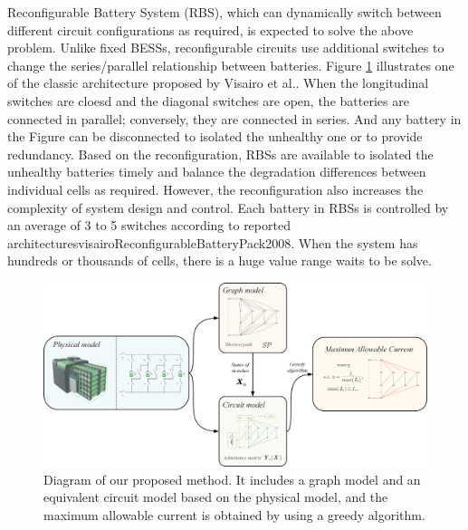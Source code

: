 \documentclass{article}
\begin{document}
Reconfigurable Battery System (RBS), which can dynamically  switch between different circuit configurations as required, is expected to solve the above problem\cite{hanNextGenerationBatteryManagement2020a}.
Unlike fixed BESSs, reconfigurable circuits use additional switches to change the series/parallel relationship between batteries.
Figure \ref{fig:1} illustrates one of the classic architecture proposed by Visairo et al.\cite{visairoReconfigurableBatteryPack2008}.
When the longitudinal switches are cloesd and the diagonal switches are open, the batteries are connected in parallel; conversely, they are connected in series.
And any battery in the Figure can be disconnected to isolated the unhealthy one or to provide redundancy.
Based on the reconfiguration, RBSs are available to isolated the unhealthy batteries timely and balance the degradation differences between individual cells as required.
However, the reconfiguration also increases the complexity of system design and control.
Each battery in RBSs is controlled by an average of 3 to 5 switches according to reported architectures\cite{taesickimSeriesconnectedSelfreconfigurableMulticell2012,heReconfigurationassistedChargingLargescale2014,lawsonSoftwareConfigurableBattery2012,kimBalancedReconfigurationStorage2011,kimDependableEfficientScalable2010}visairoReconfigurableBatteryPack2008.
When the system has hundreds or thousands of cells, there is a huge value range waits to be solve.

\begin{figure}
    \centering
    \includegraphics[width=\textwidth]{../attachments/fig1-v2.png}
    \caption{Diagram of our proposed method. It includes a graph model and an equivalent circuit model based on the physical model, and the maximum allowable current is obtained by using a greedy algorithm.}
    \label{fig:1}
\end{figure}
\end{document}
